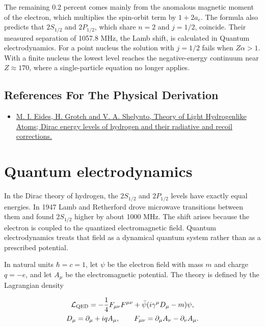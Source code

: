 \documentclass[11pt,oneside]{book}
\newenvironment{centeredalign}{\[\begin{gathered}[c]}{\end{gathered}\]}
\begin{document}
The remaining 0.2 percent comes mainly from the anomalous magnetic moment of the electron, which multiplies the spin-orbit term by \(1+2a_e\). The formula also predicts that \(2S_{1/2}\) and \(2P_{1/2}\), which share \(n=2\) and \(j=1/2\), coincide. Their measured separation of 1057.8 MHz, the Lamb shift, is calculated in Quantum electrodynamics. For a point nucleus the solution with \(j=1/2\) fails when \(Z\alpha>1\). With a finite nucleus the lowest level reaches the negative-energy continuum near \(Z\approx170\), where a single-particle equation no longer applies.

\subsection*{References For The Physical Derivation}
\begin{itemize}
\item \href{https://arxiv.org/abs/hep-ph/0002158}{M. I. Eides, H. Grotch and V. A. Shelyuto, Theory of Light Hydrogenlike Atoms; Dirac energy levels of hydrogen and their radiative and recoil corrections.}
\end{itemize}





\clearpage

\section{Quantum electrodynamics}

\label{topic:quantum-electrodynamics}

In the Dirac theory of hydrogen, the \(2S_{1/2}\) and \(2P_{1/2}\) levels have exactly equal energies. In 1947 Lamb and Retherford drove microwave transitions between them and found \(2S_{1/2}\) higher by about 1000 MHz. The shift arises because the electron is coupled to the quantized electromagnetic field. Quantum electrodynamics treats that field as a dynamical quantum system rather than as a prescribed potential.

In natural units \(\hbar=c=1\), let \(\psi\) be the electron field with mass \(m\) and charge \(q=-e\), and let \(A_\mu\) be the electromagnetic potential. The theory is defined by the Lagrangian density

\begin{centeredalign}
\mathcal L_{\rm QED}=-\frac14F_{\mu\nu}F^{\mu\nu}+\bar\psi(i\gamma^\mu D_\mu-m)\psi,\\
D_\mu=\partial_\mu+iqA_\mu,\qquad F_{\mu\nu}=\partial_\mu A_\nu-\partial_\nu A_\mu.
\end{centeredalign}
\end{document}

